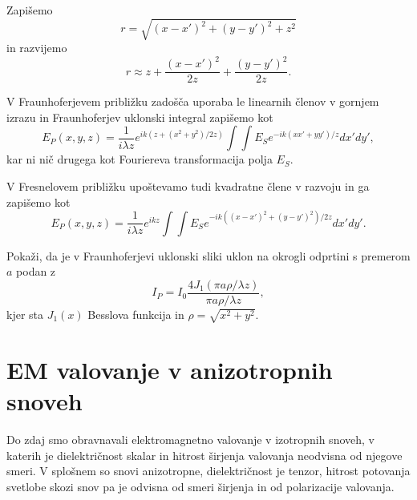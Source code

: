 Zapišemo
\begin{equation}
r = \sqrt{(x-x')^2+(y-y')^2 + z^2}
\end{equation}
in razvijemo
\begin{equation}
r \approx z + \frac{(x-x')^2}{2z} +\frac{(y-y')^2}{2z}.
\end{equation}

V Fraunhoferjevem približku zadošča uporaba le linearnih členov v gornjem
izrazu in Fraunhoferjev uklonski integral zapišemo kot
\begin{equation}
\label{eq:FraunhoferApprox}
E_P(x,y,z) =  \frac{1}{i\lambda z} e^{i k (z + (x^2+y^2) /2z)}\int \int E_S e^{-ik (xx'+yy')/z} dx' dy',
\end{equation}
kar ni nič drugega kot Fouriereva transformacija polja $E_S$.

V Fresnelovem približku upoštevamo tudi kvadratne člene v razvoju in ga zapišemo kot
\begin{equation}
\label{eq:FresnelApprox}
E_P(x,y,z) =  \frac{1}{i \lambda z } e^{i k z}\int \int E_S e^{-ik ((x-x')^2+(y-y')^2)/2z} dx' dy'.
\end{equation}

\begin{definition}
\label{naloga-Frauhofer-Kirchhoff-uklon}
Pokaži, da je v Fraunhoferjevi uklonski sliki uklon na okrogli odprtini s premerom $a$ podan z
\begin{equation}
I_P = I_0\frac{4 J_1(\pi a \rho/ \lambda z)}{\pi a \rho/ \lambda z},
\end{equation}
kjer sta $J_1(x)$ Besslova funkcija in $\rho = \sqrt{x^2+y^2}$.
\end{definition}

\section{EM valovanje v anizotropnih snoveh}\label{chap:anizotropni}
Do zdaj smo obravnavali elektromagnetno valovanje
v izotropnih snoveh, v katerih je dielektričnost skalar in hitrost širjenja
valovanja neodvisna od njegove smeri. V splošnem so snovi anizotropne,
dielektričnost je tenzor, hitrost potovanja svetlobe 
skozi snov pa je odvisna od smeri širjenja in od polarizacije valovanja. 

